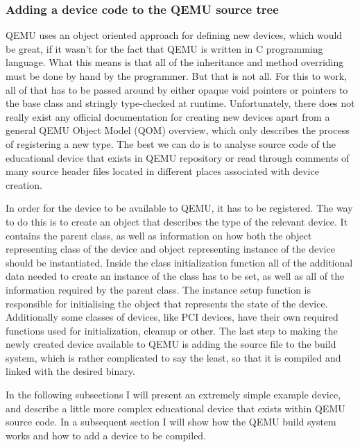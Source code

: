 \subsubsection{Adding a device code to the QEMU source tree}

QEMU uses an object oriented approach for defining new devices, which would be
great, if it wasn't for the fact that QEMU is written in C programming language.
What this means is that all of the inheritance and method overriding must be done
by hand by the programmer. But that is not all. For this to work, all of that has
to be passed around by either opaque void pointers or pointers to the base
class and stringly type-checked at runtime. Unfortunately, there does not really
exist any official documentation for creating new devices apart from a general
QEMU Object Model (QOM) overview, which only describes the process of registering
a new type. The best we can do is to analyse source code of the educational device
that exists in QEMU repository or read through comments of many source header
files located in different places associated with device creation.

In order for the device to be available to QEMU, it has to be registered. The
way to do this is to create an object that describes the type of the relevant device.
It contains the parent class, as well as information on how both the object
representing class of the device and object representing instance of the
device should be instantiated. Inside the class initialization function all of
the additional data needed to create an instance of the class has to be set, as
well as all of the information required by the parent class. The instance setup
function is responsible for initialising the object that represents the state
of the device. Additionally some classes of devices, like PCI devices, have
their own required functions used for initialization, cleanup or other. The
last step to making the newly created device available to QEMU is adding the
source file to the build system, which is rather complicated to say the least,
so that it is compiled and linked with the desired binary.

In the following subsections I will present an extremely simple example device,
and describe a little more complex educational device that exists within QEMU
source code. In a subsequent section I will show how the QEMU build system
works and how to add a device to be compiled.


